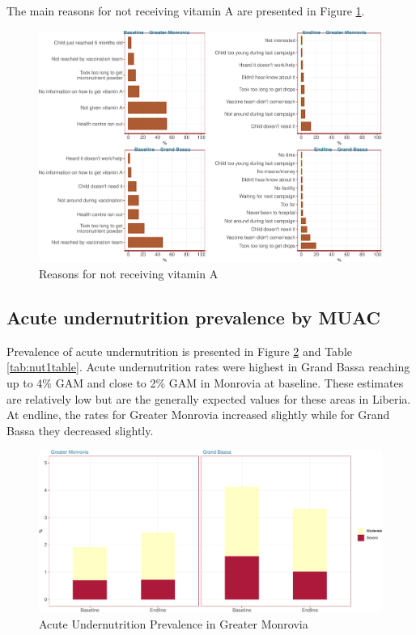\documentclass[12pt,a4paper]{article}
\begin{document}
The main reasons for not receiving vitamin A are presented in Figure \ref{fig:vit2plot}.

\begin{figure}

{\centering \includegraphics{liberiaCoverageFinalReport_files/figure-latex/vit2plot-1} 

}

\caption{Reasons for not receiving vitamin A}\label{fig:vit2plot}
\end{figure}

\newpage

\hypertarget{acute-undernutrition-prevalence-by-muac}{%
\subsection{Acute undernutrition prevalence by MUAC}\label{acute-undernutrition-prevalence-by-muac}}

Prevalence of acute undernutrition is presented in Figure \ref{fig:nut1plot} and Table \ref{tab:nut1table}. Acute undernutrition rates were highest in Grand Bassa reaching up to 4\% GAM and close to 2\% GAM in Monrovia at baseline. These estimates are relatively low but are the generally expected values for these areas in Liberia. At endline, the rates for Greater Monrovia increased slightly while for Grand Bassa they decreased slightly.

\begin{figure}[H]

{\centering \includegraphics{liberiaCoverageFinalReport_files/figure-latex/nut1plot-1} 

}

\caption{Acute Undernutrition Prevalence in Greater Monrovia}\label{fig:nut1plot}
\end{figure}
\end{document}
